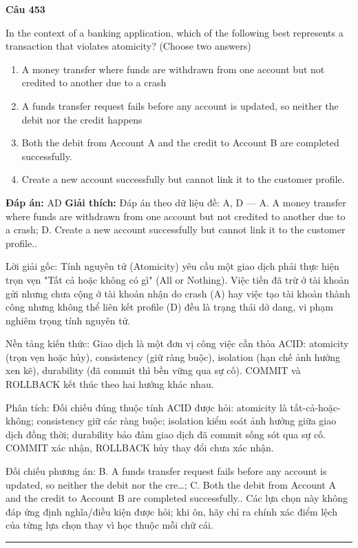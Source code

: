 \documentclass[11pt,a4paper]{article}
\newenvironment{question}[1]{%
  \par\vspace{1em}\noindent\textbf{\large Câu #1}\par\vspace{0.4em}
}{%
  \par\vspace{1em}\hrule\vspace{0.6em}
}
\newenvironment{choices}{%
  \begin{enumerate}[label=\textbf{\Alph*.},leftmargin=2.2em,itemsep=2pt,topsep=3pt]
}{%
  \end{enumerate}
}
\newcommand{\choice}{\item}
\begin{document}
\begin{question}{453}
In the context of a banking application, which of the following best represents a transaction that violates atomicity? (Choose two answers)
\begin{choices}
\choice A money transfer where funds are withdrawn from one account but not credited to another due to a crash
\choice A funds transfer request fails before any account is updated, so neither the debit nor the credit happens
\choice Both the debit from Account A and the credit to Account B are completed successfully.
\choice Create a new account successfully but cannot link it to the customer profile.
\end{choices}
\textbf{Đáp án:} AD
\textbf{Giải thích:} Đáp án theo dữ liệu đề: A, D — A. A money transfer where funds are withdrawn from one account but not credited to another due to a crash; D. Create a new account successfully but cannot link it to the customer profile..

Lời giải gốc: Tính nguyên tử (Atomicity) yêu cầu một giao dịch phải thực hiện trọn vẹn "Tất cả hoặc không có gì" (All or Nothing). Việc tiền đã trừ ở tài khoản gửi nhưng chưa cộng ở tài khoản nhận do crash (A) hay việc tạo tài khoản thành công nhưng không thể liên kết profile (D) đều là trạng thái dở dang, vi phạm nghiêm trọng tính nguyên tử.

Nền tảng kiến thức: Giao dịch là một đơn vị công việc cần thỏa ACID: atomicity (trọn vẹn hoặc hủy), consistency (giữ ràng buộc), isolation (hạn chế ảnh hưởng xen kẽ), durability (đã commit thì bền vững qua sự cố). COMMIT và ROLLBACK kết thúc theo hai hướng khác nhau.

Phân tích: Đối chiếu đúng thuộc tính ACID được hỏi: atomicity là tất-cả-hoặc-không; consistency giữ các ràng buộc; isolation kiểm soát ảnh hưởng giữa giao dịch đồng thời; durability bảo đảm giao dịch đã commit sống sót qua sự cố. COMMIT xác nhận, ROLLBACK hủy thay đổi chưa xác nhận.

Đối chiếu phương án: B. A funds transfer request fails before any account is updated, so neither the debit nor the cre…; C. Both the debit from Account A and the credit to Account B are completed successfully.. Các lựa chọn này không đáp ứng định nghĩa/điều kiện được hỏi; khi ôn, hãy chỉ ra chính xác điểm lệch của từng lựa chọn thay vì học thuộc mỗi chữ cái.
\end{question}
\end{document}
